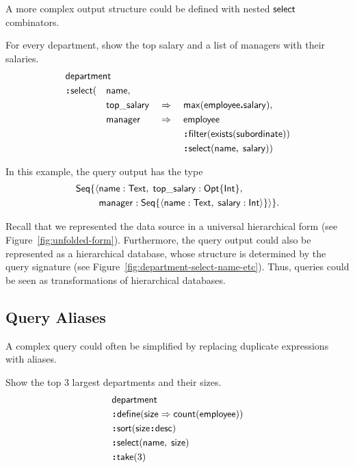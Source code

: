 A more complex output structure could be defined with nested $\mathsf{select}$ combinators.

\begin{demo}
    \label{ex:department-select-name-etc}
    For every department, show the top salary and a list of managers with their
    salaries.
    \begin{alignat*}{4}
        & \Department\hidewidth && && && \\
        & \Apply\Select( && \Name, && && \\
            & && \TopSalary && \As\; && \Max(\Employee\To\Salary), \\
            & && \Manager && \As\; && \Employee \\
            & && && && \Apply\Filter(\Exists(\Subordinate)) \\
            & && && && \Apply\Select(\Name,\; \Salary))
    \end{alignat*}
\end{demo}

In this example, the query output has the type
\begin{align*}
    \mathsf{Seq}\{\langle & \mathsf{name} : \mathsf{Text},\; \mathsf{top\_salary} : \mathsf{Opt}{\left\{\mathsf{Int}\right\}}, \\
    & \mathsf{manager} : \mathsf{Seq}{\left\{\langle \mathsf{name} : \mathsf{Text},\; \mathsf{salary} : \mathsf{Int} \rangle\right\}} \rangle\}.
\end{align*}

Recall that we represented the data source in a universal hierarchical form
(see Figure~\ref{fig:unfolded-form}).  Furthermore, the query output could also
be represented as a hierarchical database, whose structure is determined by the
query signature (see Figure~\ref{fig:department-select-name-etc}).  Thus,
queries could be seen as transformations of hierarchical databases.



\subsection*{Query Aliases}

A complex query could often be simplified by replacing duplicate expressions
with aliases.

\begin{demo}
    \label{ex:department-define-size}
    Show the top 3 largest departments and their sizes.
    \begin{align*}
        & \Department \\
        & \Apply\Define(\Size\As\Count(\Employee)) \\
        & \Apply\Sort(\Size\Apply\Desc) \\
        & \Apply\Select(\Name,\; \Size) \\
        & \Apply\Take(3)
    \end{align*}
\end{demo}

